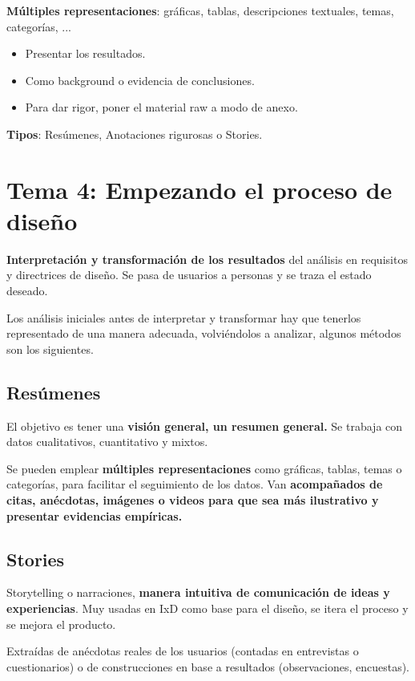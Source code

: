 \documentclass[12pt]{report} %
\begin{document}
\textbf{Múltiples representaciones}: gráficas, tablas, descripciones textuales, temas, categorías, ...

\begin{itemize}
\item
  Presentar los resultados.
\item
  Como background o evidencia de conclusiones.
\item
  Para dar rigor, poner el material raw a modo de anexo.
\end{itemize}

\textbf{Tipos}: Resúmenes, Anotaciones rigurosas o Stories.

\chapter{Tema 4: Empezando el proceso de
diseño}

\textbf{Interpretación y transformación de los resultados} del análisis
en requisitos y directrices de diseño. Se pasa de usuarios a personas y
se traza el estado deseado.

Los análisis iniciales antes de interpretar y transformar hay que
tenerlos representado de una manera adecuada, volviéndolos a analizar,
algunos métodos son los siguientes.

\section{Resúmenes}

El objetivo es tener una \textbf{visión general, un resumen general.} Se
trabaja con datos cualitativos, cuantitativo y mixtos.

Se pueden emplear \textbf{múltiples representaciones} como gráficas,
tablas, temas o categorías, para facilitar el seguimiento de los datos.
Van \textbf{acompañados de citas, anécdotas, imágenes o videos para que
sea más ilustrativo y presentar evidencias empíricas.}

\section{Stories}

Storytelling o narraciones, \textbf{manera intuitiva de comunicación de
ideas y experiencias}. Muy usadas en IxD como base para el diseño, se
itera el proceso y se mejora el producto.

Extraídas de anécdotas reales de los usuarios (contadas en entrevistas o
cuestionarios) o de construcciones en base a resultados (observaciones,
encuestas).
\end{document}
